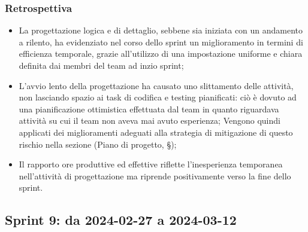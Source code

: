\documentclass[10pt, a4paper]{article}
\begin{document}
\subsubsection{Retrospettiva}
\begin{itemize}
    \item La progettazione logica e di dettaglio, sebbene sia iniziata con un andamento a rilento, ha evidenziato nel corso dello sprint un miglioramento in termini di efficienza temporale, grazie all'utilizzo di una impostazione uniforme e chiara definita dai membri del team ad inzio sprint;
    \item L'avvio lento della progettazione ha causato uno slittamento delle attività, non lasciando spazio ai task di codifica e testing pianificati: ciò è dovuto ad una pianificazione ottimistica effettuata dal team in quanto riguardava attività su cui il team non aveva mai avuto esperienza; Vengono quindi applicati dei miglioramenti adeguati alla strategia di mitigazione di questo rischio nella sezione (Piano di progetto, \S{});
    \item Il rapporto ore produttive ed effettive riflette l'inesperienza temporanea nell'attività di progettazione ma riprende positivamente verso la fine dello sprint.
\end{itemize}


\subsection{Sprint 9: da 2024-02-27 a 2024-03-12}
\end{document}
